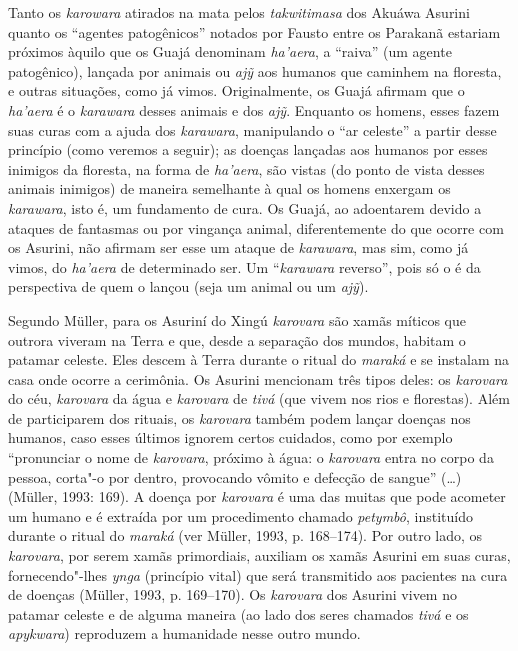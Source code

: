 Tanto os \emph{karowara} atirados na mata pelos \emph{takwitimasa} dos
Akuáwa Asurini quanto os ``agentes patogênicos'' notados por Fausto entre
os Parakanã estariam próximos àquilo que os Guajá denominam
\emph{ha'aera}, a ``raiva'' (um agente patogênico), lançada por animais ou
\emph{ajỹ} aos humanos que caminhem na floresta, e outras situações,
como já vimos. Originalmente, os Guajá afirmam que o \emph{ha'aera} é o
\emph{karawara} desses animais e dos \emph{ajỹ}. Enquanto os homens,
esses fazem suas curas com a ajuda dos \emph{karawara}, manipulando o
``ar celeste'' a partir desse princípio (como veremos a seguir); as
doenças lançadas aos humanos por esses inimigos da floresta, na forma de
\emph{ha'aera}, são vistas (do ponto de vista desses animais inimigos)
de maneira semelhante à qual os homens enxergam os \emph{karawara}, isto
é, um fundamento de cura. Os Guajá, ao adoentarem devido a ataques de
fantasmas ou por vingança animal, diferentemente do que ocorre com os
Asurini, não afirmam ser esse um ataque de \emph{karawara}, mas sim,
como já vimos, do \emph{ha'aera} de determinado ser. Um ``\emph{karawara}
reverso'', pois só o é da perspectiva de quem o lançou (seja um animal ou
um \emph{ajỹ}).

Segundo Müller, para os Asuriní do Xingú \emph{karovara} são xamãs
míticos que outrora viveram na Terra e que, desde a separação dos
mundos, habitam o patamar celeste. Eles descem à Terra durante o ritual
do \emph{maraká} e se instalam na casa onde ocorre a cerimônia. Os
Asurini mencionam três tipos deles: os \emph{karovara} do céu,
\emph{karovara} da água e \emph{karovara} de \emph{tivá} (que vivem nos
rios e florestas). Além de participarem dos rituais, os \emph{karovara}
também podem lançar doenças nos humanos, caso esses últimos ignorem
certos cuidados, como por exemplo ``pronunciar o nome de \emph{karovara},
próximo à água: o \emph{karovara} entra no corpo da pessoa, corta"-o por
dentro, provocando vômito e defecção de sangue'' (\ldots{}) (Müller, 1993:
169). A doença por \emph{karovara} é uma das muitas que pode acometer um
humano e é extraída por um procedimento chamado \emph{petymbô},
instituído durante o ritual do \emph{maraká} (ver Müller, 1993, p.
168--174). Por outro lado, os \emph{karovara}, por serem xamãs
primordiais, auxiliam os xamãs Asurini em suas curas, fornecendo"-lhes
\emph{ynga} (princípio vital) que será transmitido aos pacientes na cura
de doenças (Müller, 1993, p. 169--170). Os \emph{karovara} dos Asurini
vivem no patamar celeste e de alguma maneira (ao lado dos seres chamados
\emph{tivá} e os \emph{apykwara}) reproduzem a humanidade nesse outro
mundo.

